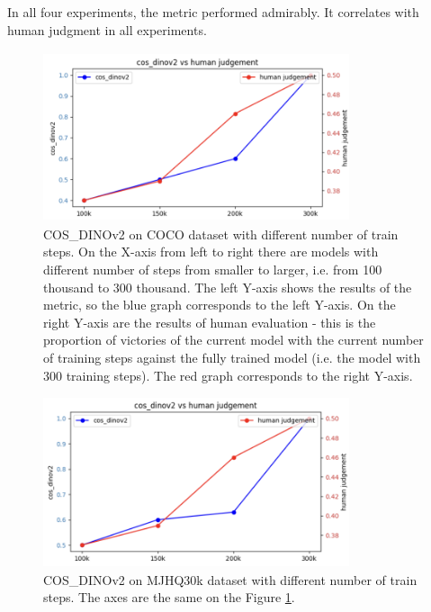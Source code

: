 In all four experiments, the metric performed admirably. It correlates with human judgment in all experiments.

\begin{figure}[]
\centering
\includegraphics[width=9cm, height=5cm]{figs/coco_train_steps_COS_DINOv2.png}
\caption{COS\_DINOv2 on COCO dataset with different number of train steps. On the X-axis from left to right there are models with different number of steps from smaller to larger, i.e. from 100 thousand to 300 thousand. The left Y-axis shows the results of the metric, so the blue graph corresponds to the left Y-axis. On the right Y-axis are the results of human evaluation - this is the proportion of victories of the current model with the current number of training steps against the fully trained model (i.e. the model with 300 training steps). The red graph corresponds to the right Y-axis.}
\label{fig:coco_train_steps_cos_dinov2}
\end{figure}

\begin{figure}[]
\centering
\includegraphics[width=9cm, height=5cm]{figs/mjhq30k_train_steps_COS_DINOv2.png}
\caption{COS\_DINOv2 on MJHQ30k dataset with different number of train steps. The axes are the same on the Figure \ref{fig:coco_train_steps_cos_dinov2}.}
\label{fig:mjhq30k_train_steps_cos_dinov2}
\end{figure}

